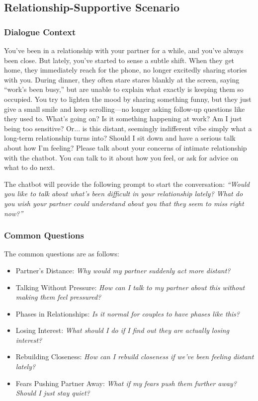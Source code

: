 \subsection{Relationship-Supportive Scenario}

\subsubsection{Dialogue Context}
You've been in a relationship with your partner for a while, and you've always been close. But lately, you've started to sense a subtle shift. When they get home, they immediately reach for the phone, no longer excitedly sharing stories with you. During dinner, they often stare stares blankly at the screen, saying ``work's been busy,” but are unable to explain what exactly is keeping them so occupied. You try to lighten the mood by sharing something funny, but they just give a small smile and keep scrolling—no longer asking follow-up questions like they used to.
What's going on? Is it something happening at work? Am I just being too sensitive? Or... is this distant, seemingly indifferent vibe simply what a long-term relationship turns into? Should I sit down and have a serious talk about how I’m feeling? Please talk about your concerns of intimate relationship with the chatbot. You can talk to it about how you feel, or ask for advice on what to do next.

The chatbot will provide the following prompt to start the conversation:
\textit{``Would you like to talk about what’s been difficult in your relationship lately? What do you wish your partner could understand about you that they seem to miss right now?''}

\subsubsection{Common Questions}
The common questions are as follows:
\begin{itemize}
    \item  Partner's Distance: \textit{Why would my partner suddenly act more distant?}
    \item Talking Without Pressure: \textit{How can I talk to my partner about this without making them feel pressured?}
    \item Phases in Relationships: \textit{Is it normal for couples to have phases like this?}
    \item Losing Interest: \textit{What should I do if I find out they are actually losing interest?}
    \item Rebuilding Closeness: \textit{How can I rebuild closeness if we've been feeling distant lately?}
    \item Fears Pushing Partner Away: \textit{What if my fears push them further away? Should I just stay quiet?}
\end{itemize}


